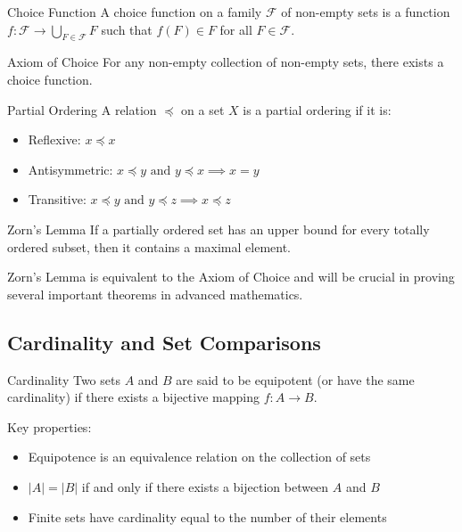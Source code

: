 \documentclass[12pt,a4paper]{article}
\begin{document}
\begin{definitionbox}{Choice Function}
A choice function on a family $\mathcal{F}$ of non-empty sets is a function $f: \mathcal{F} \to \bigcup_{F \in \mathcal{F}} F$ such that $f(F) \in F$ for all $F \in \mathcal{F}$.
\end{definitionbox}

\begin{theorembox}{Axiom of Choice}
For any non-empty collection of non-empty sets, there exists a choice function.
\end{theorembox}

\begin{definitionbox}{Partial Ordering}
A relation $\preceq$ on a set $X$ is a partial ordering if it is:
\begin{itemize}
    \item Reflexive: $x \preceq x$
    \item Antisymmetric: $x \preceq y \text{ and } y \preceq x \implies x = y$
    \item Transitive: $x \preceq y \text{ and } y \preceq z \implies x \preceq z$
\end{itemize}
\end{definitionbox}

\begin{theorembox}{Zorn's Lemma}
If a partially ordered set has an upper bound for every totally ordered subset, then it contains a maximal element.
\end{theorembox}

\begin{note}
Zorn's Lemma is equivalent to the Axiom of Choice and will be crucial in proving several important theorems in advanced mathematics.
\end{note}

\subsection{Cardinality and Set Comparisons}

\begin{definitionbox}{Cardinality}
Two sets $A$ and $B$ are said to be equipotent (or have the same cardinality) if there exists a bijective mapping $f: A \to B$. 

Key properties:
\begin{itemize}
    \item Equipotence is an equivalence relation on the collection of sets
    \item $|A| = |B|$ if and only if there exists a bijection between $A$ and $B$
    \item Finite sets have cardinality equal to the number of their elements
\end{itemize}
\end{definitionbox}
\end{document}
